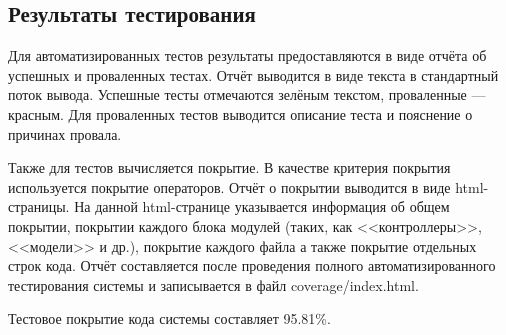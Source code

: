 \subsection{Результаты тестирования}

Для автоматизированных тестов результаты предоставляются в виде отчёта об успешных и проваленных тестах. Отчёт выводится в виде текста в стандартный поток вывода. Успешные тесты отмечаются зелёным текстом, проваленные --- красным. Для проваленных тестов выводится описание теста и пояснение о причинах провала.

Также для тестов вычисляется покрытие. В качестве критерия покрытия используется покрытие операторов. Отчёт о покрытии выводится в виде html-страницы. На данной html-странице указывается информация об общем покрытии, покрытии каждого блока модулей (таких, как <<контроллеры>>, <<модели>> и др.), покрытие каждого файла а также покрытие отдельных строк кода. Отчёт составляется после проведения полного автоматизированного тестирования системы и записывается в файл coverage/index.html.

Тестовое покрытие кода системы составляет 95.81\%.
